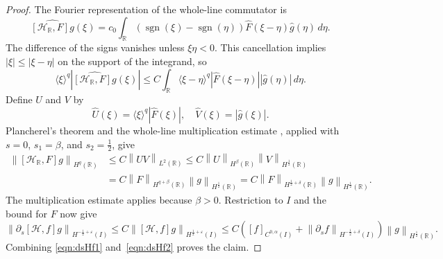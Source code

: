 \documentclass[11pt,reqno]{amsart}
\theoremstyle{plain}
\theoremstyle{definition}
\numberwithin{equation}{section}
\newcommand{\paren}[1]{\left(#1\right)}
\newcommand{\p}{\partial}
\newcommand{\mc}[1]{\mathcal{#1}}
\newcommand{\wh}[1]{\widehat{#1}}
\newcommand{\abs}[1]{\left\lvert #1 \right\rvert}
\newcommand{\norm}[1]{\left\lVert #1 \right\rVert}
\newcommand{\R}{\mathbb{R}}
\newcommand{\ci}[1]{C^{#1}(I)}
\newcommand{\hi}[1]{H^{#1}(I)}
\newcommand{\hr}[1]{H^{#1}(\R)}
\begin{document}
\begin{proof}
The Fourier representation of the whole-line commutator is
\begin{equation}
    \wh{[\mc H_{\R},F]g}(\xi)
    =c_0\int_\R
    \paren{\operatorname{sgn}(\xi)-\operatorname{sgn}(\eta)}
    \wh F(\xi-\eta)\wh g(\eta)\,d\eta.
\end{equation}
The difference of the signs vanishes unless $\xi\eta<0$. This cancellation
implies $\abs{\xi}\le\abs{\xi-\eta}$ on the support of the integrand, so
\begin{equation}
    \langle\xi\rangle^q
    \abs{\wh{[\mc H_{\R},F]g}(\xi)}
    \le C\int_\R
    \langle\xi-\eta\rangle^q
    \abs{\wh F(\xi-\eta)}\abs{\wh g(\eta)}\,d\eta.
\end{equation}
Define $U$ and $V$ by
\begin{equation}
    \wh U(\xi)=\langle\xi\rangle^q\abs{\wh F(\xi)},
    \quad
    \wh V(\xi)=\abs{\wh g(\xi)}.
\end{equation}
Plancherel's theorem and the whole-line multiplication estimate
\cite[Theorem~7.3]{Behzadan2021}, applied with $s=0$, $s_1=\beta$, and
$s_2=\frac12$, give
\begin{equation}
\begin{aligned}
    \norm{[\mc H_{\R},F]g}_{\hr{q}}
    &\le C\norm{UV}_{L^2(\R)}
    \le C\norm{U}_{\hr{\beta}}\norm{V}_{\hr{\frac12}} \\
    &=C\norm{F}_{\hr{q+\beta}}\norm{g}_{\hr{\frac12}}
    =C\norm{F}_{\hr{\frac12+\delta}}\norm{g}_{\hr{\frac12}}.
\end{aligned}
\end{equation}
The multiplication estimate applies because $\beta>0$. Restriction to $I$
and the bound for $F$ now give
\begin{equation}\label{eqn:dsHf2}
    \norm{\p_s[\mc H,f]g}_{\hi{-\frac12+\varepsilon}}
    \le C\norm{[\mc H,f]g}_{\hi{\frac12+\varepsilon}}
    \le C\paren{[f]_{\ci{0,\alpha}}
    +\norm{\p_s f}_{\hi{-\frac12+\delta}}}
    \norm{g}_{\hr{\frac12}}.
\end{equation}
Combining \eqref{eqn:dsHf1} and~\eqref{eqn:dsHf2} proves the claim.
\end{proof}
\end{document}
